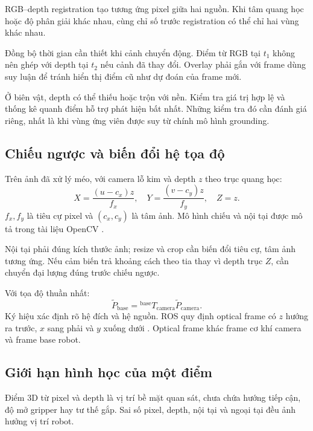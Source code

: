 RGB--depth registration tạo tương ứng pixel giữa hai nguồn. Khi tâm quang học hoặc độ phân giải khác nhau, cùng chỉ số trước registration có thể chỉ hai vùng khác nhau.

Đồng bộ thời gian cần thiết khi cảnh chuyển động. Điểm từ RGB tại $t_1$ không nên ghép với depth tại $t_2$ nếu cảnh đã thay đổi. Overlay phải gắn với frame dùng suy luận để tránh hiển thị điểm cũ như dự đoán của frame mới.

Ở biên vật, depth có thể thiếu hoặc trộn với nền. Kiểm tra giá trị hợp lệ và thống kê quanh điểm hỗ trợ phát hiện bất nhất. Những kiểm tra đó cần đánh giá riêng, nhất là khi vùng ứng viên được suy từ chính mô hình grounding.

\subsection{Chiếu ngược và biến đổi hệ tọa độ}

Trên ảnh đã xử lý méo, với camera lỗ kim và depth $z$ theo trục quang học:
\begin{equation}
    X=\frac{(u-c_x)z}{f_x},\quad
    Y=\frac{(v-c_y)z}{f_y},\quad Z=z.
    \label{eq:theory-backprojection}
\end{equation}
$f_x,f_y$ là tiêu cự pixel và $(c_x,c_y)$ là tâm ảnh. Mô hình chiếu và nội tại được mô tả trong tài liệu OpenCV \cite{opencvCameraModel}.

Nội tại phải đúng kích thước ảnh; resize và crop cần biến đổi tiêu cự, tâm ảnh tương ứng. Nếu cảm biến trả khoảng cách theo tia thay vì depth trục $Z$, cần chuyển đại lượng đúng trước chiếu ngược.

Với tọa độ thuần nhất:
\begin{equation}
    \widetilde{P}_{\mathrm{base}}=
    {}^{\mathrm{base}}T_{\mathrm{camera}}
    \widetilde{P}_{\mathrm{camera}}.
    \label{eq:theory-camera-base}
\end{equation}
Ký hiệu xác định rõ hệ đích và hệ nguồn. ROS quy định optical frame có $z$ hướng ra trước, $x$ sang phải và $y$ xuống dưới \cite{foote2010rep103}. Optical frame khác frame cơ khí camera và frame base robot.

\subsection{Giới hạn hình học của một điểm}

Điểm 3D từ pixel và depth là vị trí bề mặt quan sát, chưa chứa hướng tiếp cận, độ mở gripper hay tư thế gắp. Sai số pixel, depth, nội tại và ngoại tại đều ảnh hưởng vị trí robot.

